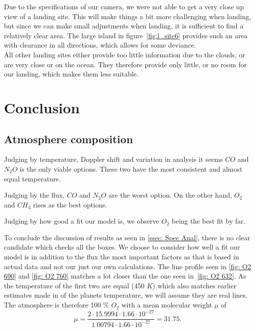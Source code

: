 \documentclass[reprint,english,notitlepage]{revtex4-2}
\begin{document}
    Due to the specifications of our camera, we were not able to get a very close up view of a landing site.
    This will make things a bit more challenging when landing, but since we can make small adjustments when landing, it is sufficient to find a relatively clear area.
    The large island in figure~\ref{fig:l_site6} provides such an area with clearance in all directions, which allows for some deviance.\\

    All other landing sites either provide too little information due to the clouds, or are very close or on the ocean.
    They therefore provide only little, or no room for our landing, which makes them less suitable.



\section{Conclusion} \label{sec: conclusion}
\subsection{Atmosphere composition} \label{ssec: Atmpos Comp}
Judging by temperature, Doppler shift and variation in analysis it seems $ CO $ and $ N_2O $ is the only viable options.
These two have the most consistent and almost equal temperature.

Judging by the flux, $ CO $ and $ N_2O  $ are the worst option.
On the other hand, $ O_2 $ and $ CH_4 $ rises as the best options.

Judging by how good a fit our model is, we observe $ O_2 $ being the best fit by far. 

To conclude the discussion of results as seen in \ref{ssec: Spec Anal}, there is no clear candidate which checks all the boxes.
We choose to consider how well a fit our model is in addition to the flux the most important factors as that is based in actual data and not our just our own calculations.
The line profile seen in \ref{fig: O2 690} and \ref{fig: O2 760} matches a lot closer than the one seen in~\ref{fig: O2 632}.
As the temperature of the first two are equal (450 $ K $) which also matches earlier estimates made in %
of the planets temperature, we will assume they are real lines.
The atmosphere is therefore 100 \% $ O_2 $ with a mean molecular weight $ \mu $ of
\[
\mu =   \frac{2 ⋅ 15.9994 ⋅  1.66 ⋅ 10^{-27}}{1.00794 ⋅ 1.66  ⋅  10^{-27}} = 31.75.
\]
\end{document}
